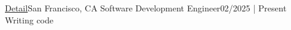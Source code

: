 \resumeSubheading
{\href{https://detail.dev}{Detail}}{San Francisco, CA}
{Software Development Engineer}{02/2025 | Present}
\resumeItemListStart
{}
{Writing code}
\resumeItemListEnd
